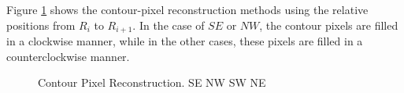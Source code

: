 Figure \ref{fig:image13} shows the contour-pixel reconstruction methods using the relative positions from $R_i$ to $R_{i+1}$. In the case of $SE$ or $NW$, the contour pixels are filled in a clockwise manner, while in the other cases, these pixels are filled in a counterclockwise manner.

\begin{figure}[htbp]
	\centering
	\caption{Contour Pixel Reconstruction. \protect{} SE \protect{} NW \protect{} SW \protect{} NE}
	\label{fig:image13}
\end{figure}

